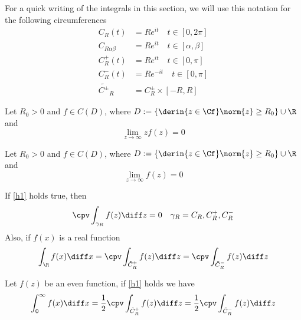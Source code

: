 \documentclass[../mmf.tex]{subfiles}
\begin{document}
\begin{ntn}
	For a quick writing of the integrals in this section, we will use this notation for the following circumferences
	\begin{equation*}
		\begin{aligned}
			C_R(t)&=Re^{it}\quad t\in[0,2\pi]\\
			C_{R\alpha\beta}&=Re^{it}\quad t\in[\alpha,\beta]\\
			C_R^+(t)&=Re^{it}\quad t\in[0,\pi]\\
			C_R^-(t)&=Re^{-it}\quad t\in[0,\pi]\\
			\tilde{C^{\pm}}_R&=C_R^{\pm}\times[-R,R]
		\end{aligned}
	\end{equation*}
\end{ntn}
\begin{hyp}
	Let $R_0>0$ and $f\in C(D)$, where $D:=\left\{ \derin{z\in\Cf}\norm{z}\ge R_0 \right\}\cup\R$ and
	\begin{equation*}
		\lim_{z\to\infty}zf(z)=0
	\end{equation*}
	\label{h1}
\end{hyp}
\begin{hyp}
	Let $R_0>0$ and $f\in C(D)$, where $D:=\left\{ \derin{z\in\Cf}\norm{z}\ge R_0 \right\}\cup\R$ and
	\begin{equation*}
		\lim_{z\to\infty}f(z)=0
	\end{equation*}
	\label{h2}
\end{hyp}
\begin{thm}
	If \eqref{h1} holds true, then
	\begin{equation}
		\cpv\int_{\gamma_R}^{}f(z)\diff z=0\quad\gamma_R= C_R,C_R^+,C_R^-
		\label{eq:h11}
	\end{equation}
	Also, if $f(x)$ is a real function
	\begin{equation}
		\int_{\R}^{}f(x)\diff x=\cpv\int_{\tilde{C}_R^+}f(z)\diff z=\cpv\int_{\tilde{C}_R^-}^{}f(z)\diff z
		\label{eq:h12}
	\end{equation}
\end{thm}
\begin{thm}
	Let $f(z)$ be an even function, if \eqref{h1} holds we have
	\begin{equation}
		\int_{0}^{\infty}f(x)\diff x=\frac{1}{2}\cpv\int_{\tilde{C}^+_R}^{}f(z)\diff z=\frac{1}{2}\cpv\int_{\tilde{C}^-_R}^{}f(z)\diff z
		\label{eq:creven}
	\end{equation}
\end{thm}
\end{document}
